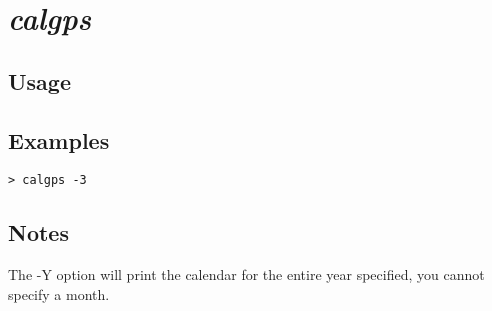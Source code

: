 \section{\emph{calgps}}
\subsection{Usage}
\subsection{Examples}
\begin{verbatim}
> calgps -3
\end{verbatim}
\subsection{Notes}
The -Y option will print the calendar for the entire year specified, you cannot specify a month.

